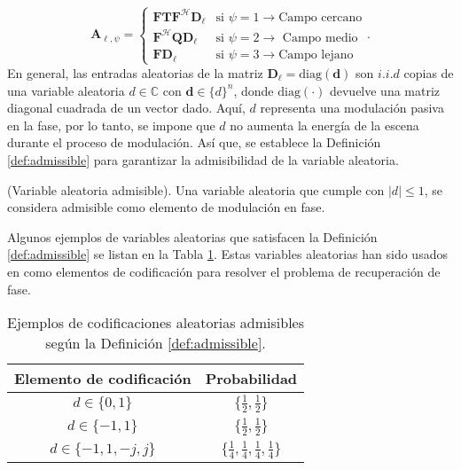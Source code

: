 \begin{equation}
    \mathbf{A}_{\ell,\psi}= \left\{\begin{matrix}
\mathbf{F}\mathbf{T}\mathbf{F}^\mathcal{H} \mathbf{D}_\ell  & \text{si } \psi=1\rightarrow \text{Campo cercano}\\ 
\mathbf{F}^\mathcal{H}\mathbf{Q}\mathbf{D}_\ell &\text{si } \psi=2\rightarrow\text{ Campo medio} \\ 
\mathbf{F}\mathbf{D}_\ell  &\text{si } \psi=3\rightarrow\text{Campo lejano}
\end{matrix}\right.. \label{eq:matrix_a}
\end{equation}
En general, las entradas aleatorias de la matriz  $\mathbf{D}_{\ell} = \mathrm{diag}(\mathbf{d})$ son $i.i.d$ copias de una variable aleatoria $d \in \mathbb{C}$ con $\mathbf{d} \in \{d\}^{n}$, donde $\mathrm{diag}(\cdot)$ devuelve una matriz diagonal cuadrada de un vector dado. Aquí, $d$ representa una modulación pasiva en la fase, por lo tanto, se impone que $d$ no aumenta la energía de la escena durante el proceso de modulación. Así que, se establece la Definición \ref{def:admissible} para garantizar la admisibilidad de la variable aleatoria.

\begin{definition}{(Variable aleatoria admisible). } 
    Una variable aleatoria que cumple con $|d|\leq 1$, se considera admisible como elemento de modulación en fase.\label{def:admissible}
\end{definition}


Algunos ejemplos de variables aleatorias que satisfacen la Definición \ref{def:admissible} se listan en la Tabla \ref{tab:admi_examples}. Estas variables aleatorias han sido usados en  como elementos de codificación para resolver el problema de recuperación de fase.

\begin{table}[!h]
\centering
\caption{Ejemplos de codificaciones aleatorias admisibles según la Definición \ref{def:admissible}.}
\begin{tabular}{|c|c|}
\hline
\textbf{Elemento de codificación} & \textbf{Probabilidad}                     \\ \hline
$d \in \{0, 1\}$         & $\{ \frac{1}{2},  \frac{1}{2}\}$ \\ \hline
$d \in \{-1, 1\}$        & $\{ \frac{1}{2},  \frac{1}{2}\}$ \\ \hline
$d \in \{-1, 1, -j,  j\}$ & $\{ \frac{1}{4},  \frac{1}{4}, \frac{1}{4},  \frac{1}{4}\}$ \\ \hline
\end{tabular}
\label{tab:admi_examples}
\end{table}

